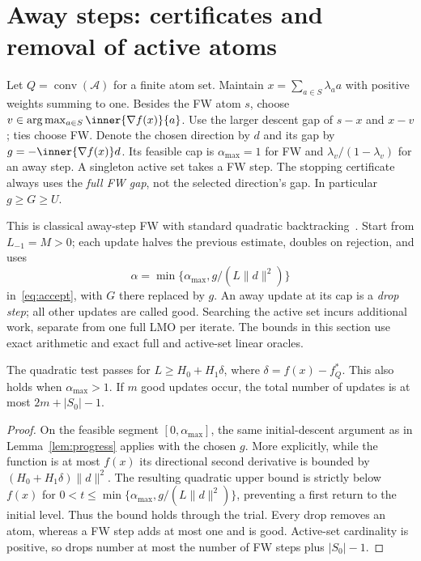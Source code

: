 \section{Away steps: certificates and removal of active atoms}
Let $Q=\operatorname{conv}(\mathcal A)$ for a finite atom set. Maintain
$x=\sum_{a\in S}\lambda_a a$ with positive weights summing to one.
Besides the FW atom $s$, choose $v\in\arg\max_{a\in S}\inner{\nabla f(x)}{a}$.
Use the larger descent gap of $s-x$ and $x-v$; ties choose FW. Denote the
chosen direction by $d$ and its gap by $g=-\inner{\nabla f(x)}d$.
Its feasible cap is $\alpha_{\max}=1$ for FW and
$\lambda_v/(1-\lambda_v)$ for an away step. A singleton active set takes
a FW step. The stopping certificate always uses the \emph{full FW gap},
not the selected direction's gap. In particular $g\ge G\ge U$.

This is classical away-step FW with standard quadratic
backtracking~\cite{lacostejaggi,pedregosa}. Start from $L_{-1}=M>0$;
each update halves the previous estimate, doubles on rejection, and
uses
\[
 \alpha=\min\{\alpha_{\max},g/(L\|d\|^2)\}
\]
in~\eqref{eq:accept}, with $G$ there replaced by $g$.
An away update at its cap is a \emph{drop step}; all other updates are
called good. Searching the active set incurs additional work, separate
from one full LMO per iterate.
The bounds in this section use exact arithmetic and exact full and
active-set linear oracles.

\begin{lemma}\label{lem:away}
The quadratic test passes for $L\ge H_0+H_1\delta$, where
$\delta=f(x)-f_Q^*$. This also holds when $\alpha_{\max}>1$.
If $m$ good updates occur, the total number of updates is at most
$2m+|S_0|-1$.
\end{lemma}
\begin{proof}
On the feasible segment $[0,\alpha_{\max}]$, the same initial-descent
argument as in Lemma~\ref{lem:progress} applies with the chosen $g$.
More explicitly, while the function is at most $f(x)$ its directional
second derivative is bounded by $(H_0+H_1\delta)\|d\|^2$.
The resulting quadratic upper bound is strictly below $f(x)$ for
$0<t\le\min\{\alpha_{\max},g/(L\|d\|^2)\}$, preventing a first
return to the initial level. Thus the bound holds through the trial.
Every drop removes an atom, whereas a FW step adds at most one and is
good. Active-set cardinality is positive, so drops number at most the
number of FW steps plus $|S_0|-1$.
\end{proof}

